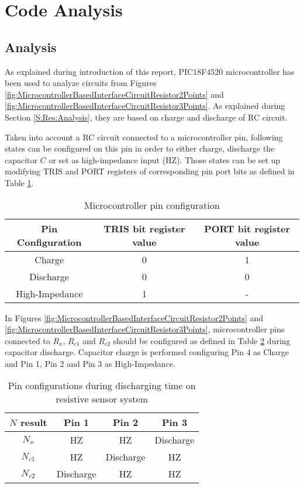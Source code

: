 \section{Code Analysis}\label{S:Res:Code}


\subsection{Analysis}\label{SS:Res:Code:Analysis}
As explained during introduction of this report, PIC18F4520 microcontroller has been used to analyze circuits from Figures \ref{fig:MicrocontrollerBasedInterfaceCircuitResistor2Points} and \ref{fig:MicrocontrollerBasedInterfaceCircuitResistor3Points}. As explained during Section \ref{S:Res:Analysis}, they are based on charge and discharge of RC circuit.
\medskip

Taken into account a RC circuit connected to a microcontroller pin, following states can be configured on this pin in order to either charge, discharge the capacitor $C$ or set as high-impedance input (HZ). Those states can be set up modifying TRIS and PORT registers of corresponding pin port bits as defined in Table \ref{tab:PinConfigurations}.
\medskip

\begin{table}[h]
\centering
\begin{tabular}{|c|c|c|}
\hline
Pin Configuration & TRIS bit register value & PORT bit register value \\
\hline
Charge & 0 & 1 \\
\hline
Discharge & 0 & 0 \\
\hline
High-Impedance & 1 & - \\
\hline
\end{tabular}
\caption{Microcontroller pin configuration}
\label{tab:PinConfigurations}
\end{table}
\medskip

In Figures \ref{fig:MicrocontrollerBasedInterfaceCircuitResistor2Points} and \ref{fig:MicrocontrollerBasedInterfaceCircuitResistor3Points}, microcontroller pins connected to $R_{x}$, $R_{c1}$ and $R_{c2}$ should be configured as defined in Table \ref{tab:DischargePinConfigurationsRes} during capacitor discharge. Capacitor charge is performed configuring Pin 4 as Charge and Pin 1, Pin 2 and Pin 3 as High-Impedance.
\medskip

\begin{table}[h]
\centering
\begin{tabular}{|c|c|c|c|}
\hline
$N$ result & Pin 1 & Pin 2 & Pin 3 \\
\hline
$N_{x}$ & HZ & HZ & Discharge \\
\hline
$N_{c1}$ & HZ & Discharge & HZ \\
\hline
$N_{c2}$ & Discharge & HZ & HZ \\
\hline
\end{tabular}
\caption{Pin configurations during discharging time on resistive sensor system}
\label{tab:DischargePinConfigurationsRes}
\end{table}
\medskip

